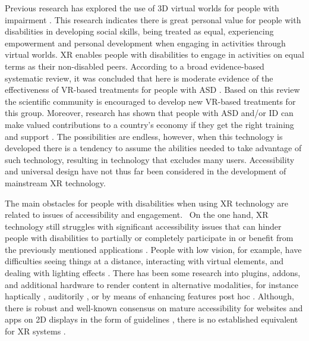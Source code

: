 \documentclass[11pt,english]{nik}
\begin{document}
Previous research has explored the use of 3D virtual worlds for people with impairment
\autocite{standen-brown-VR-Review-2005,Standen-Brown-VRRole-2006,Carr2010xd}. 
This research indicates there is great personal value for people with disabilities in
developing social skills, being treated as equal, experiencing empowerment and personal development when engaging in
activities through virtual worlds. XR enables people with disabilities to engage in activities on equal terms as their
non-disabled peers. According to a broad evidence-based systematic review, it was concluded that here is moderate
evidence of the effectiveness of VR-based treatments for people with ASD \autocite{mesa-gresa-effectiveness-2018}. 
Based on this review the scientific
community is encouraged to develop new VR-based treatments for this group. Moreover, research has shown that people
with ASD and/or ID can make valued contributions to a country’s economy if they get the right training and
support \autocite{parmenter-2011}. The possibilities are
endless, however, when this technology is developed there is a tendency to assume the abilities needed to take
advantage of such technology, resulting in technology that excludes many users. Accessibility and universal design
have not thus far been considered in the development of mainstream XR technology. 

The main obstacles for people with disabilities when using XR technology are related to issues of accessibility and
engagement. \ On the one hand, XR technology still struggles with significant accessibility issues that can hinder
people with disabilities to partially or completely participate in or benefit from the previously mentioned
applications \autocite{mott2019accessible,zhao2019seeingvr}. 
People with low vision, for example, have difficulties seeing things at a distance, interacting with
virtual elements, and dealing with lighting effects \autocite{zhao2019seeingvr}. 
There has been some research into plugins, addons, and
additional hardware to render content in alternative modalities, for instance haptically 
\autocite{DART-06-2014,10.1145/274497.274515,10.1007/978-3-319-94274-2_17,Lecuyer-etal-2003,zhao2019seeingvr},
auditorily \autocite{gonzalez-mora-etal-2006,PICINALI2014393,maidenbaum-etal-2013,OSullivan-etal-2015},
or by means of enhancing features post hoc \autocite{mott2019accessible}. Although, there is robust and
well-known consensus on mature accessibility for websites and apps on 2D displays in the form of
guidelines \autocite{android-guide,w3c-contrast,WCAG-21},
there is no established equivalent for XR systems \autocite{mott2019accessible,zhao2019seeingvr}. 
\end{document}

